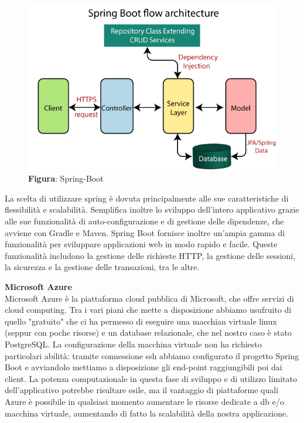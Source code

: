     \begin{figure}[H]
        \centering
        \includegraphics[scale=0.3]{assets/immagini varie/spring-boot-architecture2.png}
        \caption*{\textbf{Figura}: Spring-Boot}\label{fig:spring_Arch}
    \end{figure}

    \begin{flushleft}
        La scelta di utilizzare spring è dovuta principalmente alle sue caratteristiche di flessibilità e scalabilità. Semplifica inoltre lo sviluppo dell'intero applicativo
        grazie alle sue funzionalità di auto-configurazione e di gestione delle dipendenze, che avviene con Gradle e Maven. Spring Boot fornisce inoltre un'ampia gamma di funzionalità per sviluppare applicazioni web in modo rapido e facile. Queste funzionalità includono la gestione delle richieste HTTP, la gestione delle sessioni, la sicurezza e la gestione delle transazioni, tra le altre.
    \end{flushleft}
    

    \newpage

    \begin{flushleft}
        \textbf{Microsoft Azure}\\
        Microsoft Azure è la piattaforma cloud pubblica di Microsoft, che offre servizi di cloud computing. Tra i vari piani che mette a disposizione abbiamo usufruito
        di quello "gratuito" che ci ha permesso di eseguire una macchian virtuale linux (seppur con poche risorse) e un database relazionale, che nel nostro caso è stato PostgreSQL.
        La configurazione della macchina virtuale non ha richiesto particolari abilità: tramite connessione ssh abbiamo configurato il progetto Spring Boot e avviandolo 
        mettiamo a disposizione gli end-point raggiungibili poi dai client.
        La potenza computazionale in questa fase di sviluppo e di utilizzo limitato dell'applicativo potrebbe risultare esile, ma il vantaggio di piattaforme quali
        Azure è possibile in qualsiasi momento aumentare le risorse dedicate a db e/o macchina virtuale, aumentando di fatto la scalabilità della nostra applicazione.
        
    \end{flushleft}

